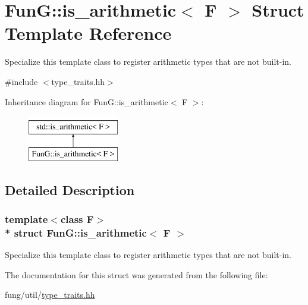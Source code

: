 \hypertarget{structFunG_1_1is__arithmetic}{}\section{FunG\+:\+:is\+\_\+arithmetic$<$ F $>$ Struct Template Reference}
\label{structFunG_1_1is__arithmetic}


Specialize this template class to register arithmetic types that are not built-\/in.  




{\ttfamily \#include $<$type\+\_\+traits.\+hh$>$}

Inheritance diagram for FunG\+:\+:is\+\_\+arithmetic$<$ F $>$\+:\begin{figure}[H]
\begin{center}
\leavevmode
\includegraphics[height=2.000000cm]{structFunG_1_1is__arithmetic}
\end{center}
\end{figure}


\subsection{Detailed Description}
\subsubsection*{template$<$class F$>$\\*
struct Fun\+G\+::is\+\_\+arithmetic$<$ F $>$}

Specialize this template class to register arithmetic types that are not built-\/in. 

The documentation for this struct was generated from the following file\+:\begin{DoxyCompactItemize}
\item 
fung/util/\hyperlink{type__traits_8hh}{type\+\_\+traits.\+hh}\end{DoxyCompactItemize}
